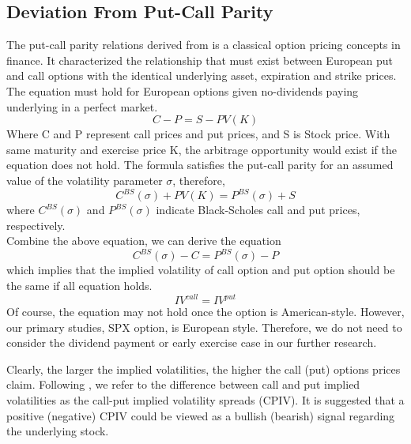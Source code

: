 
\subsection{Deviation From Put-Call Parity}
The put-call parity relations derived from \textcite{stoll1969relationship} is a classical option pricing concepts in finance. It characterized the relationship that must exist between European put and call options with the identical underlying asset, expiration and strike prices. The equation must hold for European options given no-dividends paying underlying in a perfect market. 
\begin{equation}
C-P = S - PV(K)
\end{equation}
Where C and P represent call prices and put prices, and S is Stock price. With same maturity and exercise price K, the arbitrage opportunity would exist if the equation does not hold. The \textcite{black1973pricing} formula satisfies the put-call parity for an assumed value of the volatility parameter $\sigma$, therefore, 
\begin{equation}
C^{BS}(\sigma ) + PV(K) = P^{BS}(\sigma ) + S
\end{equation}
where $C^{BS}(\sigma )$ and $P^{BS}(\sigma )$ indicate Black-Scholes call and put prices, respectively. 
\\
Combine the above equation, we can derive the equation
\begin{equation}
C^{BS}(\sigma ) - C = P^{BS}(\sigma ) - P
\end{equation}
which implies that the implied volatility of call option and put option should be the same if all equation holds. 
\begin{equation}
IV^{call} = IV^{put}
\end{equation}
Of course, the equation may not hold once the option is American-style. However, our primary studies, SPX option, is European style. Therefore, we do not need to consider the dividend payment or early exercise case in our further research. 

Clearly, the larger the implied volatilities, the higher the call (put) options prices claim. Following \textcite{amin2004index}, we refer to the difference between call and put implied volatilities as the call-put implied volatility spreads (CPIV). It is suggested that a positive (negative) CPIV could be viewed as a bullish (bearish) signal regarding the underlying stock. 

